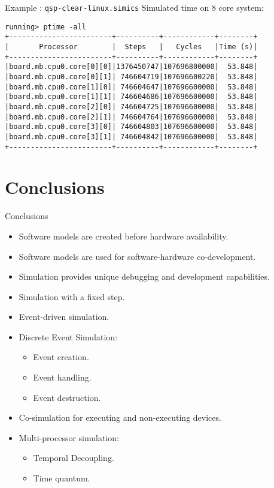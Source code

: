 \begin{frame}[fragile]{Example : \texttt{qsp-clear-linux.simics}}
Simulated time on 8 core system:
\begin{verbatim}
running> ptime -all
+------------------------+----------+------------+--------+
|       Processor        |  Steps   |   Cycles   |Time (s)|
+------------------------+----------+------------+--------+
|board.mb.cpu0.core[0][0]|1376450747|107696800000|  53.848|
|board.mb.cpu0.core[0][1]| 746604719|107696600220|  53.848|
|board.mb.cpu0.core[1][0]| 746604647|107696600000|  53.848|
|board.mb.cpu0.core[1][1]| 746604686|107696600000|  53.848|
|board.mb.cpu0.core[2][0]| 746604725|107696600000|  53.848|
|board.mb.cpu0.core[2][1]| 746604764|107696600000|  53.848|
|board.mb.cpu0.core[3][0]| 746604803|107696600000|  53.848|
|board.mb.cpu0.core[3][1]| 746604842|107696600000|  53.848|
+------------------------+----------+------------+--------+
\end{verbatim}
\end{frame}

\section*{Conclusions}

\begin{frame}{Conclusions}
\begin{itemize}
\item Software models are created before hardware availability.
\item Software models are used for software-hardware co-development.
\item Simulation provides unique debugging and development capabilities.
\item Simulation with a fixed step.
\item Event-driven simulation.
\item Discrete Event Simulation:
  \begin{itemize}
  \item Event creation.
  \item Event handling.
  \item Event destruction.
  \end{itemize}
\item Co-simulation for executing and non-executing devices.
\item Multi-processor simulation:
  \begin{itemize}
    \item Temporal Decoupling.
    \item Time quantum.
  \end{itemize}
\end{itemize}
\end{frame}

